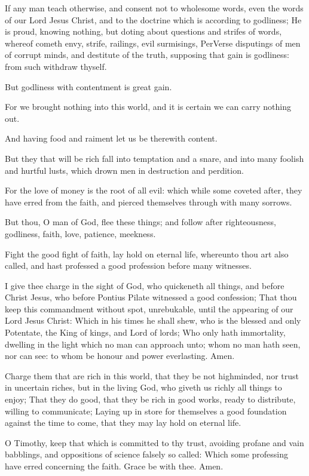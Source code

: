 \Verse If any man teach otherwise, and consent not to wholesome words, even the words of our Lord Jesus Christ, and to the doctrine which is according to godliness; \Verse He is proud, knowing nothing, but doting about questions and strifes of words, whereof cometh envy, strife, railings, evil surmisings, \Verse PerVerse disputings of men of corrupt minds, and destitute of the truth, supposing that gain is godliness: from such withdraw thyself.

\Verse But godliness with contentment is great gain.

\Verse For we brought nothing into this world, and it is certain we can carry nothing out.

\Verse And having food and raiment let us be therewith content.

\Verse But they that will be rich fall into temptation and a snare, and into many foolish and hurtful lusts, which drown men in destruction and perdition.

\Verse For the love of money is the root of all evil: which while some coveted after, they have erred from the faith, and pierced themselves through with many sorrows.

\Verse But thou, O man of God, flee these things; and follow after righteousness, godliness, faith, love, patience, meekness.

\Verse Fight the good fight of faith, lay hold on eternal life, whereunto thou art also called, and hast professed a good profession before many witnesses.

\Verse I give thee charge in the sight of God, who quickeneth all things, and before Christ Jesus, who before Pontius Pilate witnessed a good confession; \Verse That thou keep this commandment without spot, unrebukable, until the appearing of our Lord Jesus Christ: \Verse Which in his times he shall shew, who is the blessed and only Potentate, the King of kings, and Lord of lords; \Verse Who only hath immortality, dwelling in the light which no man can approach unto; whom no man hath seen, nor can see: to whom be honour and power everlasting. Amen.

\Verse Charge them that are rich in this world, that they be not highminded, nor trust in uncertain riches, but in the living God, who giveth us richly all things to enjoy; \Verse That they do good, that they be rich in good works, ready to distribute, willing to communicate; \Verse Laying up in store for themselves a good foundation against the time to come, that they may lay hold on eternal life.

\Verse O Timothy, keep that which is committed to thy trust, avoiding profane and vain babblings, and oppositions of science falsely so called: \Verse Which some professing have erred concerning the faith.  Grace be with thee. Amen.

